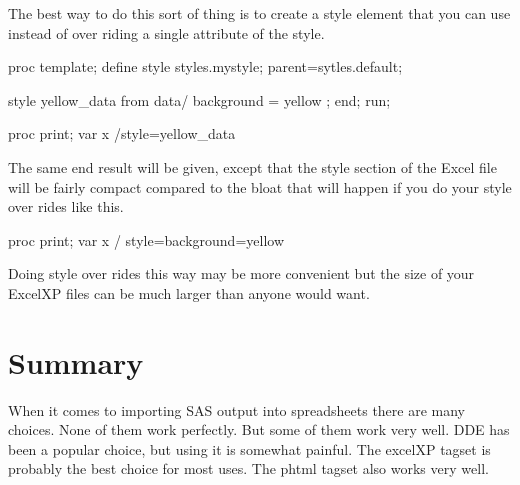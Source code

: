 The best way to do this sort of thing is to create a style element that you can
use instead of over riding a single attribute of the style.

\begin{sfvcode}
proc template;
     define style styles.mystyle;
            parent=sytles.default;

            style yellow_data from data/
               background = yellow
            ;
      end;
run;

proc print;
   var x /style=yellow_data
\end{sfvcode}

The same end result will be given, except that the style section
of the Excel file will be fairly compact compared to the bloat that
will happen if you do your style over rides like this.


\begin{sfvcode}
proc print;
   var x / style={background=yellow}

\end{sfvcode}


Doing style over rides this way may be more convenient but the 
size of your ExcelXP files can be much larger than anyone would want.


\section{Summary}
When it comes to importing SAS output into spreadsheets there are many choices.
None of them work perfectly.  But some of them work very well.  DDE has been a
popular choice, but using it is somewhat painful.  The excelXP tagset is probably
the best choice for most uses.  The phtml tagset also works very well.


